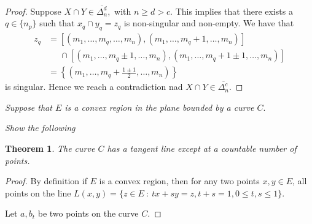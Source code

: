 \documentclass[letter]{article}
\newtheorem{theorem}{Theorem}
\newenvironment{menumerate}{%
  \edef\backupindent{\the\parindent}%
  \enumerate%
  \setlength{\parindent}{\backupindent}%
}{\endenumerate}
\begin{document}
\begin{menumerate}
\begin{menumerate}
\begin{proof}
					Suppose $X \cap Y \in \overline{\Delta_n^d},$ with $n \geq d > c$.  This implies that there exists a $q \in \{n_p\}$ such that $x_q \cap y_q = z_q$ is non-singular and non-empty. We have that
					\begin{equation*}
						\begin{aligned}
							z_q &= [(m_1,\dots,m_q,\dots,m_n), (m_1,\dots,m_q+1,\dots,m_n)]\\
								&\;\;\;\;\; \cap  [(m_1,\dots,m_q \pm 1,\dots,m_n), (m_1,\dots,m_q+1 \pm 1,\dots,m_n)] \\
								&= \left\{\left(m_1,\dots,m_q+\frac{1\pm1}{2},\dots,m_n  \right)\right\}

						\end{aligned}
					\end{equation*}
					is singular. Hence we reach a contradiction nad $X\cap Y \in \overline{\Delta_n^c}. $

 				\end{proof}
		\end{menumerate} 


		\setcounter{enumi}{31}
		\item \textit{Suppose that $E$ is a convex region in the plane bounded by a curve $C.$}
			\begin{menumerate}
				\item \textit{Show the following}
					\begin{theorem}
						The curve $C$ has a tangent line except at a countable number of points.
					\end{theorem}

					\begin{proof}
						By definition if $E$ is a convex region, then for any two points $x,y \in E$, all points on the line $L(x,y) = \{z \in E\ :\ tx +sy = z, t+s = 1, 0 \leq t,s\leq 1\}.$ 

						Let $a,b_t$ be two points on the curve $C$. 
					\end{proof} 
			\end{menumerate} 

		
		
\end{menumerate}
\end{document}
